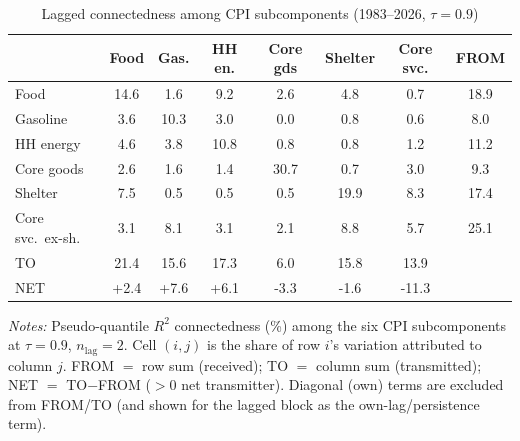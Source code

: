 \begin{table}[!ht]
\centering
\caption{Lagged connectedness among CPI subcomponents (1983--2026, $\tau=0.9$)}
\label{tab:connlcore}
\setlength{\tabcolsep}{4pt}\footnotesize
\begin{threeparttable}
\begin{tabular}{l c c c c c c c}
\toprule
 & Food & Gas. & HH en. & Core gds & Shelter & Core svc. & FROM \\
\midrule
Food & 14.6 & 1.6 & 9.2 & 2.6 & 4.8 & 0.7 & 18.9 \\
Gasoline & 3.6 & 10.3 & 3.0 & 0.0 & 0.8 & 0.6 & 8.0 \\
HH energy & 4.6 & 3.8 & 10.8 & 0.8 & 0.8 & 1.2 & 11.2 \\
Core goods & 2.6 & 1.6 & 1.4 & 30.7 & 0.7 & 3.0 & 9.3 \\
Shelter & 7.5 & 0.5 & 0.5 & 0.5 & 19.9 & 8.3 & 17.4 \\
Core svc.\ ex-sh. & 3.1 & 8.1 & 3.1 & 2.1 & 8.8 & 5.7 & 25.1 \\
\midrule
TO & 21.4 & 15.6 & 17.3 & 6.0 & 15.8 & 13.9 &  \\
NET & +2.4 & +7.6 & +6.1 & -3.3 & -1.6 & -11.3 &  \\
\bottomrule
\end{tabular}
\begin{tablenotes}[flushleft]\footnotesize
\item \textit{Notes:} Pseudo-quantile $R^2$ connectedness (\%) among the six CPI subcomponents at $\tau=0.9$, $n_{\text{lag}}=2$. Cell $(i,j)$ is the share of row $i$'s variation attributed to column $j$. FROM $=$ row sum (received); TO $=$ column sum (transmitted); NET $=$ TO$-$FROM ($>0$ net transmitter). Diagonal (own) terms are excluded from FROM/TO (and shown for the lagged block as the own-lag/persistence term).
\end{tablenotes}
\end{threeparttable}
\end{table}

